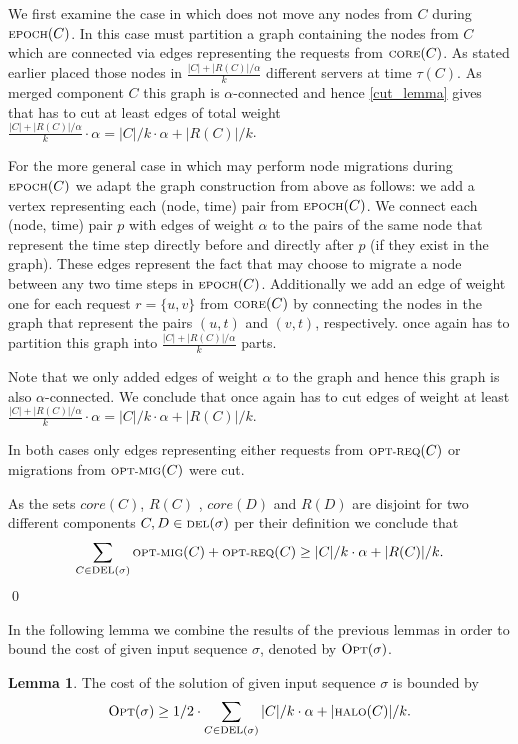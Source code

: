 \documentclass[a4paper, 10pt]{article}
\newcommand{\nl}{\newline}
\newcommand{\crep}{\text{C{\scriptsize REP}}}
\newcommand{\optmig}{\text{\scriptsize OPT-MIG}}
\newcommand{\optreq}{\text{\scriptsize OPT-REQ}}
\newcommand{\del}{\text{\scriptsize DEL}}
\newcommand{\opt}{\text{O{\scriptsize PT}}}
\newcommand{\core}{\text{\scriptsize CORE}}
\newcommand{\halo}{\text{\scriptsize HALO}}
\newcommand{\epoch}{\text{\scriptsize EPOCH}}
\theoremstyle{definition}
\newtheorem{lemma}[defi]{Lemma}
\begin{document}
We first examine the case in which \opt{} does not move any nodes from $C$ during $\epoch(C)$. In this case \opt{} must partition a graph containing the nodes from $C$ which are connected via edges representing the requests from $\core(C)$. As stated earlier \opt{} placed those nodes in $\frac{|C|+|R(C)|/\alpha}{k}$ different servers at time $\tau(C)$. As \crep{} merged component $C$ this graph is $\alpha$-connected and hence \cref{cut_lemma} gives that \opt{} has to cut at least edges of total weight $\frac{|C|+|R(C)|/\alpha}{k}\cdot\alpha=|C|/k\cdot\alpha+|R(C)|/k$.

For the more general case in which \opt{} may perform node migrations during $\epoch(C)$ we adapt the graph construction from above as follows: we add a vertex representing each (node, time) pair from $\epoch(C)$.
We connect each (node, time) pair $p$ with edges of weight $\alpha$ to the pairs of the same node that represent the time step directly before and directly after $p$ (if they exist in the graph). These edges represent the fact that \opt{} may choose to migrate a node between any two time steps in $\epoch(C)$.
Additionally we add an edge of weight one for each request $r=\{u,v\}$ from $\core(C)$ by connecting the nodes in the graph that represent the pairs $(u,t)$ and $(v,t)$, respectively. \opt{} once again has to partition this graph into $\frac{|C|+|R(C)|/\alpha}{k}$ parts.

Note that we only added edges of weight $\alpha$ to the graph and hence this graph is also $\alpha$-connected. We conclude that once again \opt{} has to cut edges of weight at least $\frac{|C|+|R(C)|/\alpha}{k}\cdot\alpha=|C|/k\cdot\alpha+|R(C)|/k$.

In both cases only edges representing either requests from $\optreq(C)$ or migrations from $\optmig(C)$ were cut.

As the sets $core(C)$, $R(C)$ , $core(D)$ and $R(D)$ are disjoint for two different components $C,D\in\del(\sigma)$ per their definition we conclude that
\begin{align*}
\sum_{C\in\del(\sigma)}\optmig(C)+\optreq(C)\geq |C|/k\cdot\alpha+|R(C)|/k.
\end{align*}
\qed\nl

In the following lemma we combine the results of the previous lemmas in order to bound the cost of \opt{} given input sequence $\sigma$, denoted by $\opt(\sigma)$.


\begin{lemma}
	\label{opt_lower_bound}
	The cost of the solution of \opt{} given input sequence $\sigma$ is bounded by
	\begin{align*}
	\opt{}(\sigma)\geq1/2\cdot\sum_{C\in\del{}(\sigma)}|C|/k\cdot\alpha+|\halo(C)|/k.
	\end{align*}
\end{lemma}
\end{document}
